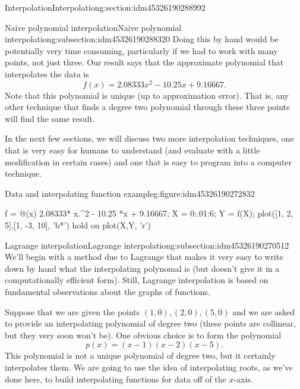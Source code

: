 \documentclass[oneside,10pt,]{article}
\numberwithin{equation}{section}
\numberwithin{equation}{section}
\begin{document}
\begin{sectionptx}{Interpolation}{}{Interpolation}{}{}{g:section:idm45326190288992}
\begin{subsectionptx}{Naive polynomial interpolation}{}{Naive polynomial interpolation}{}{}{g:subsection:idm45326190288320}
Doing this by hand would be potentially very time consuming, particularly if we had to work with many points, not just three. Our result says that the approximate polynomial that interpolates the data is%
\begin{equation*}
f(x) = 2.08333 x^2 - 10.25 x + 9.16667.
\end{equation*}
Note that this polynomial is unique (up to approximation error). That is, any other technique that finds a degree two polynomial through these three points will find the same result.%
\par
In the next few sections, we will discuss two more interpolation techniques, one that is very easy for humans to understand (and evaluate with a little modification in certain cases) and one that is easy to program into a computer technique.%
\begin{figureptx}{Data and interpolating function example}{g:figure:idm45326190272832}{}%
\centering
\begin{sageinput}
f = @(x) 2.08333* x.^2 - 10.25 *x + 9.16667;
X = 0:.01:6;
Y = f(X);
plot([1, 2, 5],[1, -3, 10], 'b*')
hold on
plot(X,Y, 'r')
\end{sageinput}
\tcblower
\end{figureptx}%
\end{subsectionptx}
%
%
\typeout{************************************************}
\typeout{************************************************}
%
\begin{subsectionptx}{Lagrange interpolation}{}{Lagrange interpolation}{}{}{g:subsection:idm45326190270512}
We'll begin with a method due to Lagrange that makes it very easy to write down by hand what the interpolating polynomal is (but doesn't give it in a computationally efficient form). Still, Lagrange interpolation is based on fundamental observations about the graphs of functions.%
\par
Suppose that we are given the points \((1,0), (2,0), (5,0)\) and we are asked to provide an interpolating polynomial of degree two (these points are collinear, but they very soon won't be). One obvious choice is to form the polynomial%
\begin{equation*}
p(x) = (x - 1)(x - 2)(x - 5).
\end{equation*}
This polynomial is not a unique polynomial of degree two, but it certainly interpolates them. We are going to use the idea of interpolating roots, as we've done here, to build interpolating functions for data off of the \(x\)-axis.%
\par

\end{subsectionptx}
\end{sectionptx}
\end{document}
